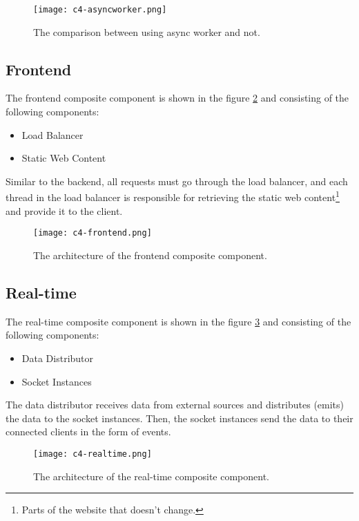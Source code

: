 \documentclass[../thesis.tex]{subfiles}
\begin{document}
\begin{figure}[!ht]
\centering
\texttt{[image: c4-asyncworker.png]}
\caption{The comparison between using async worker and not.}
\label{fig:asyncworker}
\end{figure}

\subsection{Frontend}
\label{sec:frontend}

The frontend composite component is shown in the figure \ref{fig:frontend} and consisting of the following components:
\begin{itemize}
\item Load Balancer
\item Static Web Content
\end{itemize}

Similar to the backend, all requests must go through the load balancer, and each thread in the load balancer is responsible for retrieving the static web content\footnote{Parts of the website that doesn't change.} and provide it to the client.


\begin{figure}[!ht]
\centering
\texttt{[image: c4-frontend.png]}
\caption{The architecture of the frontend composite component.}
\label{fig:frontend}
\end{figure}


\subsection{Real-time}
\label{sec:realtime}

The real-time composite component is shown in the figure \ref{fig:realtime} and consisting of the following components:

\begin{itemize}
\item Data Distributor
\item Socket Instances
\end{itemize}

The data distributor receives data from external sources and distributes (emits) the data to the socket instances. Then, the socket instances send the data to their connected clients in the form of events.

\begin{figure}[!ht]
\centering
\texttt{[image: c4-realtime.png]}
\caption{The architecture of the real-time composite component.}
\label{fig:realtime}
\end{figure}
\end{document}
